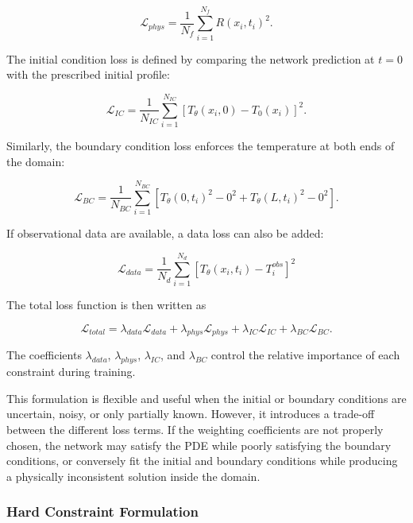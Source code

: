 \begin{equation}
\mathcal{L}_{phys} = \frac{1}{N_f} \sum_{i=1}^{N_f} R(x_i,t_i)^2.
\end{equation}

The initial condition loss is defined by comparing the network prediction at $t=0$ with the prescribed initial profile:

\begin{equation}
\mathcal{L}_{IC} = \frac{1}{N_{IC}} \sum_{i=1}^{N_{IC}} \left[ T_{\theta}(x_i,0) -  T_0(x_i) \right]^2.
\end{equation}

Similarly, the boundary condition loss enforces the temperature at both ends of the domain:

\begin{equation}
\mathcal{L}_{BC} =  \frac{1}{N_{BC}}
\sum_{i=1}^{N_{BC}}
\left[
T_{\theta}(0,t_i)^2 - 0^2
+
T_{\theta}(L,t_i)^2 - 0^2
\right].
\end{equation}

If observational data are available, a data loss can also be added:

\begin{equation}
\mathcal{L}_{data} = 
\frac{1}{N_d}
\sum_{i=1}^{N_d}
\left[
T_{\theta}(x_i,t_i) - T_i^{obs}
\right]^2
\end{equation}

The total loss function is then written as

\begin{equation}
\mathcal{L}_{total} = \lambda_{data}\mathcal{L}_{data}
+
\lambda_{phys}\mathcal{L}_{phys}
+
\lambda_{IC}\mathcal{L}_{IC}
+
\lambda_{BC}\mathcal{L}_{BC}.
\end{equation}

The coefficients $\lambda_{data}$, $\lambda_{phys}$, $\lambda_{IC}$, and $\lambda_{BC}$ control the relative importance of each constraint during training.

This formulation is flexible and useful when the initial or boundary conditions are uncertain, noisy, or only partially known. However, it introduces a trade-off between the different loss terms. If the weighting coefficients are not properly chosen, the network may satisfy the PDE while poorly satisfying the boundary conditions, or conversely fit the initial and boundary conditions while producing a physically inconsistent solution inside the domain.

\subsubsection{Hard Constraint Formulation}

